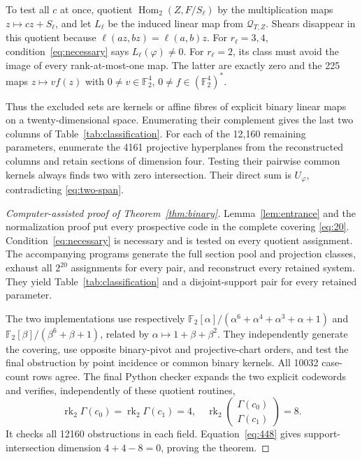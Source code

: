\documentclass[12pt,letterpaper,onecolumn]{article}
\newcommand{\F}{\mathbb F}
\theoremstyle{definition}
\begin{document}
To test all $c$ at once, quotient $\operatorname{Hom}_2(Z,F/S_\ell)$ by the multiplication maps $z\mapsto cz+S_\ell$, and let $L_\ell$ be the induced linear map from $\mathcal Q_{T,Z}$. Shears disappear in this quotient because $\ell(az,bz)=\ell(a,b)z$. For $r_\ell=3,4$, condition~\eqref{eq:necessary} says $L_\ell(\varphi)\ne0$. For $r_\ell=2$, its class must avoid the image of every rank-at-most-one map. The latter are exactly zero and the 225 maps $z\mapsto v f(z)$ with $0\ne v\in\F_2^4$, $0\ne f\in(\F_2^4)^*$.

Thus the excluded sets are kernels or affine fibres of explicit binary linear maps on a twenty-dimensional space. Enumerating their complement gives the last two columns of Table~\ref{tab:classification}. For each of the 12,160 remaining parameters, enumerate the 4161 projective hyperplanes from the reconstructed columns and retain sections of dimension four. Testing their pairwise common kernels always finds two with zero intersection. Their direct sum is $U_\varphi$, contradicting \eqref{eq:two-span}.

\begin{proof}[Computer-assisted proof of Theorem~\ref{thm:binary}]
Lemma~\ref{lem:entrance} and the normalization proof put every prospective code in the complete covering \eqref{eq:20}. Condition~\eqref{eq:necessary} is necessary and is tested on every quotient assignment. The accompanying programs generate the full section pool and projection classes, exhaust all $2^{20}$ assignments for every pair, and reconstruct every retained system. They yield Table~\ref{tab:classification} and a disjoint-support pair for every retained parameter.

The two implementations use respectively $\F_2[\alpha]/(\alpha^6+\alpha^4+\alpha^3+\alpha+1)$ and $\F_2[\beta]/(\beta^6+\beta+1)$, related by $\alpha\mapsto1+\beta+\beta^2$. They independently generate the covering, use opposite binary-pivot and projective-chart orders, and test the final obstruction by point incidence or common binary kernels. All 10032 case-count rows agree. The final Python checker expands the two explicit codewords and verifies, independently of these quotient routines,
\begin{equation}
 \operatorname{rk}_2\Gamma(c_0)=\operatorname{rk}_2\Gamma(c_1)=4,
 \quad\operatorname{rk}_2\begin{pmatrix}\Gamma(c_0)\\\Gamma(c_1)\end{pmatrix}=8.
 \label{eq:448}
\end{equation}
It checks all 12160 obstructions in each field. Equation~\eqref{eq:448} gives support-intersection dimension $4+4-8=0$, proving the theorem.
\end{proof}
\end{document}
